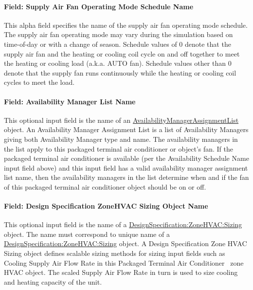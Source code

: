 \paragraph{Field: Supply Air Fan Operating Mode Schedule Name}\label{field-supply-air-fan-operating-mode-schedule-name-4-b}

This alpha field specifies the name of the supply air fan operating mode schedule. The supply air fan operating mode may vary during the simulation based on time-of-day or with a change of season. Schedule values of 0 denote that the supply air fan and the heating or cooling coil cycle on and off together to meet the heating or cooling load (a.k.a. AUTO fan). Schedule values other than 0 denote that the supply fan runs continuously while the heating or cooling coil cycles to meet the load.

\paragraph{Field: Availability Manager List Name}\label{field-availability-manager-list-name-6}

This optional input field is the name of an \hyperref[availabilitymanagerassignmentlist]{AvailabilityManagerAssignmentList} object. An Availability Manager Assignment List is a list of Availability Managers giving both Availability Manager type and name. The availability managers in the list apply to this packaged terminal air conditioner or object's fan. If the packaged terminal air conditioner is available (per the Availability Schedule Name input field above) and this input field has a valid availability manager assignment list name, then the availability managers in the list determine when and if the fan of this packaged terminal air conditioner object should be on or off.

\paragraph{Field: Design Specification ZoneHVAC Sizing Object Name}\label{field-design-specification-zonehvac-sizing-object-name-6}

This optional input field is the name of a \hyperref[designspecificationzonehvacsizing]{DesignSpecification:ZoneHVAC:Sizing} object. The name must correspond to unique name of a \hyperref[designspecificationzonehvacsizing]{DesignSpecification:ZoneHVAC:Sizing} object. A Design Specification Zone HVAC Sizing object defines scalable sizing methods for sizing input fields such as Cooling Supply Air Flow Rate in this Packaged Terminal Air Conditioner~ zone HVAC object. The scaled Supply Air Flow Rate in turn is used to size cooling and heating capacity of the unit.

